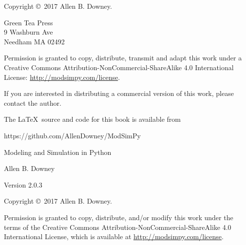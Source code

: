\documentclass[12pt]{book}
\newcommand{\thetitle}{Modeling and Simulation in Python}
\newcommand{\theauthors}{Allen B. Downey}
\newcommand{\theversion}{2.0.3}
\theoremstyle{exercise}
\begin{document}
\begin{latexonly}
\begin{flushright}
\vfill

\end{flushright}



\pagebreak
\thispagestyle{empty}

Copyright \copyright ~2017 \theauthors.



\vspace{0.2in}

\begin{flushleft}
Green Tea Press       \\
9 Washburn Ave \\
Needham MA 02492
\end{flushleft}

Permission is granted to copy, distribute, transmit and adapt this work under a Creative Commons Attribution-NonCommercial-ShareAlike 4.0 International License: \url{http://modsimpy.com/license}.

If you are interested in distributing a commercial version of this
work, please contact the author.

The \LaTeX\ source and code for this book is available from

\begin{code}
https://github.com/AllenDowney/ModSimPy
\end{code}


\cleardoublepage
\setcounter{tocdepth}{1}
\tableofcontents

\end{latexonly}



\begin{htmlonly}

\vspace{1em}

{\Large \thetitle}

{\large \theauthors}

Version \theversion

\vspace{1em}

Copyright \copyright ~2017 \theauthors.

Permission is granted to copy, distribute, and/or modify this work
under the terms of the Creative Commons
Attribution-NonCommercial-ShareAlike 4.0 International License, which is
available at \url{http://modsimpy.com/license}.

\vspace{1em}

\setcounter{chapter}{-1}

\end{htmlonly}
\end{document}
